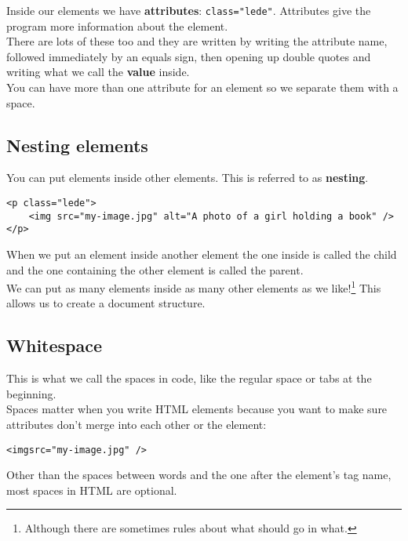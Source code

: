 Inside our elements we have \textbf{attributes}: \texttt{class="lede"}. Attributes give the program more information about the element.
\\

There are lots of these too and they are written by writing the attribute name, followed immediately by an equals sign, then opening up double quotes and writing what we call the \textbf{value} inside.
\\

You can have more than one attribute for an element so we separate them with a space.

\subsection{Nesting elements}

You can put elements inside other elements. This is referred to as \textbf{nesting}.

\begin{verbatim}
<p class="lede">
    <img src="my-image.jpg" alt="A photo of a girl holding a book" />
</p>
\end{verbatim}

When we put an element inside another element the one inside is called the child and the one containing the other element is called the parent.
\\

We can put as many elements inside as many other elements as we like!\footnote{Although there are sometimes rules about what should go in what.} This allows us to create a document structure.


\subsection{Whitespace}

This is what we call the spaces in code, like the regular space or tabs at the beginning.
\\

Spaces matter when you write HTML elements because you want to make sure attributes don't merge into each other or the element:

\begin{verbatim}
<imgsrc="my-image.jpg" />
\end{verbatim}

Other than the spaces between words and the one after the element's tag name, most spaces in HTML are optional.

